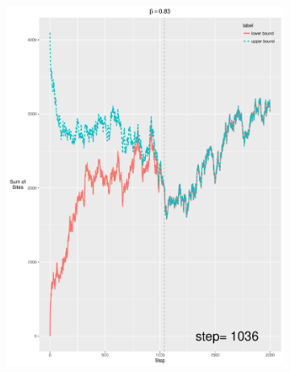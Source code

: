 \documentclass[12pt, oneside]{article}   	%
\begin{document}
\begin{figure}[H]
\begin{subfigure}[b]{0.475\textwidth}
            \includegraphics[width=\textwidth, height=0.5\textheight]{083.pdf}
        \end{subfigure} \\
\end{figure}
\end{document}
